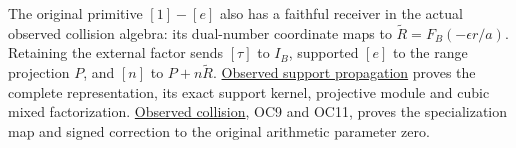 \documentclass[
]{article}
\begin{document}
The original primitive \([1]-[e]\) also has a faithful receiver in the
actual observed collision algebra: its dual-number coordinate maps to
\(\widetilde R=F_B(-\epsilon r/a)\). Retaining the external factor sends
\([\tau]\) to \(I_B\), supported \([e]\) to the range projection \(P\),
and \([n]\) to \(P+n\widetilde R\).
\href{https://github.com/KokunoYumeto/zeta-function-research-reader/blob/c9df443d9e1df000dfbb083943f97197e746eb08/workbenches/splitzero-tandem/branches/identity-absorber-square/OBSERVED_SUPPORT_PROPAGATION.md}{Observed
support propagation} proves the complete representation, its exact
support kernel, projective module and cubic mixed factorization.
\href{https://github.com/KokunoYumeto/zeta-function-research-reader/blob/c9df443d9e1df000dfbb083943f97197e746eb08/workbenches/splitzero-tandem/branches/identity-absorber-square/OBSERVED_COLLISION.md}{Observed
collision}, OC9 and OC11, proves the specialization map and signed
correction to the original arithmetic parameter zero.
\end{document}
